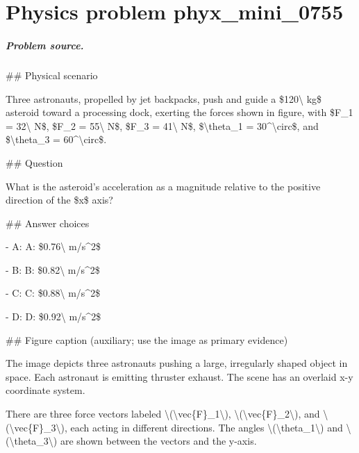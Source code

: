
\chapter{Physics problem phyx\_mini\_0755}
\label{ch:PhyXMiniProblems_problem_phyx_mini_0755}

\paragraph{Problem source.}
\#\# Physical scenario

Three astronauts, propelled by jet backpacks, push and guide a \$120\textbackslash{} kg\$ asteroid toward a processing dock, exerting the forces shown in figure, with \$F\_1 = 32\textbackslash{} N\$, \$F\_2 = 55\textbackslash{} N\$, \$F\_3 = 41\textbackslash{} N\$, \$\textbackslash{}theta\_1 = 30\textasciicircum{}\textbackslash{}circ\$, and \$\textbackslash{}theta\_3 = 60\textasciicircum{}\textbackslash{}circ\$.

\#\# Question

What is the asteroid's acceleration as a magnitude relative to the positive direction of the \$x\$ axis?

\#\# Answer choices

- A: A: \$0.76\textbackslash{} m/s\textasciicircum{}2\$

- B: B: \$0.82\textbackslash{} m/s\textasciicircum{}2\$

- C: C: \$0.88\textbackslash{} m/s\textasciicircum{}2\$

- D: D: \$0.92\textbackslash{} m/s\textasciicircum{}2\$

\#\# Figure caption (auxiliary; use the image as primary evidence)

The image depicts three astronauts pushing a large, irregularly shaped object in space. Each astronaut is emitting thruster exhaust. The scene has an overlaid x-y coordinate system.

There are three force vectors labeled \textbackslash{}(\textbackslash{}vec\{F\}\_1\textbackslash{}), \textbackslash{}(\textbackslash{}vec\{F\}\_2\textbackslash{}), and \textbackslash{}(\textbackslash{}vec\{F\}\_3\textbackslash{}), each acting in different directions. The angles \textbackslash{}(\textbackslash{}theta\_1\textbackslash{}) and \textbackslash{}(\textbackslash{}theta\_3\textbackslash{}) are shown between the vectors and the y-axis.

